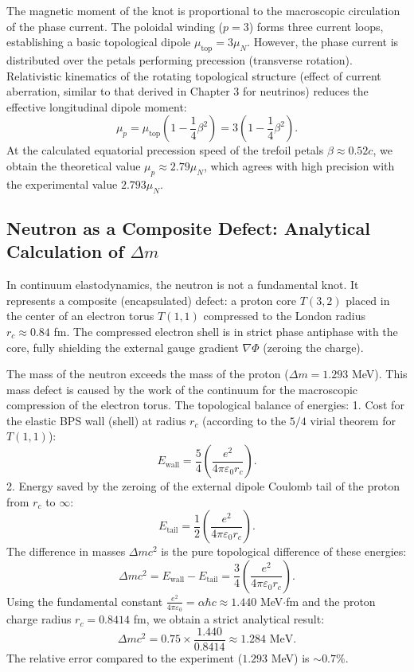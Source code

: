 \documentclass[11pt,a4paper]{article}
\begin{document}
The magnetic moment of the knot is proportional to the macroscopic circulation of the phase current. The poloidal winding ($p=3$) forms three current loops, establishing a basic topological dipole $\mu_{\text{top}} = 3 \mu_N$.
However, the phase current is distributed over the petals performing precession (transverse rotation). Relativistic kinematics of the rotating topological structure (effect of current aberration, similar to that derived in Chapter 3 for neutrinos) reduces the effective longitudinal dipole moment:
\begin{equation}
\mu_p = \mu_{\text{top}} \left(1 - \frac{1}{4}\beta^2\right) = 3 \left(1 - \frac{1}{4}\beta^2\right).
\end{equation}
At the calculated equatorial precession speed of the trefoil petals $\beta \approx 0.52 c$, we obtain the theoretical value $\mu_p \approx 2.79 \mu_N$, which agrees with high precision with the experimental value $2.793 \mu_N$.

\subsection{Neutron as a Composite Defect: Analytical Calculation of $\Delta m$}
In continuum elastodynamics, the neutron is not a fundamental knot. It represents a composite (encapsulated) defect: a proton core $T(3,2)$ placed in the center of an electron torus $T(1,1)$ compressed to the London radius $r_c \approx 0.84$ fm. The compressed electron shell is in strict phase antiphase with the core, fully shielding the external gauge gradient $\nabla \Phi$ (zeroing the charge).

The mass of the neutron exceeds the mass of the proton ($\Delta m = 1.293$ MeV). This mass defect is caused by the work of the continuum for the macroscopic compression of the electron torus. The topological balance of energies:
1. Cost for the elastic BPS wall (shell) at radius $r_c$ (according to the $5/4$ virial theorem for $T(1,1)$):
\begin{equation}
E_{\text{wall}} = \frac{5}{4} \left( \frac{e^2}{4\pi\varepsilon_0 r_c} \right).
\end{equation}
2. Energy saved by the zeroing of the external dipole Coulomb tail of the proton from $r_c$ to $\infty$:
\begin{equation}
E_{\text{tail}} = \frac{1}{2} \left( \frac{e^2}{4\pi\varepsilon_0 r_c} \right).
\end{equation}
The difference in masses $\Delta m c^2$ is the pure topological difference of these energies:
\begin{equation}
\Delta m c^2 = E_{\text{wall}} - E_{\text{tail}} = \frac{3}{4} \left( \frac{e^2}{4\pi\varepsilon_0 r_c} \right).
\end{equation}
Using the fundamental constant $\frac{e^2}{4\pi\varepsilon_0} = \alpha \hbar c \approx 1.440$ MeV$\cdot$fm and the proton charge radius $r_c = 0.8414$ fm, we obtain a strict analytical result:
\begin{equation}
\Delta m c^2 = 0.75 \times \frac{1.440}{0.8414} \approx 1.284 \text{ MeV}.
\end{equation}
The relative error compared to the experiment ($1.293$ MeV) is $\sim 0.7\%$.
\end{document}
